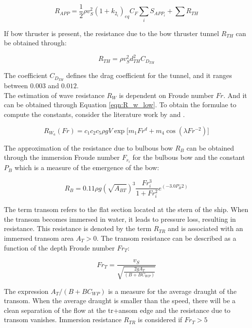 \documentclass[]{interact}
\theoremstyle{plain}%
\theoremstyle{definition}
\theoremstyle{remark}
\begin{document}
\begin{equation}\label{eqn:R_app}
  R_{APP} = \frac{1}{2}\rho v_S^2 (1+k_{2_i})_{eq} C_F \sum_i S_{APP_i} + \sum R_{TH}
\end{equation}

If bow thruster is present, the resistance due to the bow thruster tunnel $R_{TH}$ can be obtained through:

\begin{equation}
  \label{eqn:R_th}
  R_{TH} = \rho v_S^2  d_{TH}^2 C_{D_{TH}}
\end{equation}

The coefficient $C_{D_{TH}}$ defines the drag coefficient for the tunnel, and it ranges between $0.003$ and $0.012$.\\

The estimation of wave resistance $R_W$ is dependent on Froude number $Fr$. And it can be obtained through Equation \ref{eqn:R_w_low}. To obtain the formulae to compute the constants, consider the literature work by \citet{Holtrop.1978,Holtrop.1982,Holtrop.1984} and \citet{Birk.2019}.

\begin{equation}\label{eqn:R_w_low}
  R_{W_a}(Fr) = c_1 c_2 c_5 \rho g V  \exp \biggl[ m_1 Fr^d + m_4 \cos(\lambda Fr ^{-2}) \biggr]
\end{equation}

The approximation of the resistance due to bulbous bow $R_B$ can be obtained through the immersion Froude number $F_{r_i}$ for the bulbous bow and the constant $P_B$ which is a measure of the emergence of the bow: 

\begin{equation}
  \label{eqn:Rbulb}
  R_B = 0.11 \rho g (\sqrt{A_{BT}})^3 \frac{Fr_{i}^3}{1+Fr_{i}^2}e^{(-3.0P_B^-2)}
\end{equation}

The term transom refers to the flat section located at the stern of the ship. When the transom becomes immersed in water, it leads to pressure loss, resulting in resistance. This resistance is denoted by the term $R_{TR}$ and is associated with an immersed transom area $A_T > 0$. The transom resistance can be described as a function of the depth Froude number $Fr_{T}$:

\begin{equation}
  \label{eqn:Fr_t}
  Fr_T = \frac{v_S}{\sqrt{\frac{2gA_T}{(B+BC_{WP})}}}
\end{equation}

The expression $A_T/(B+BC_{WP})$ is a measure for the average draught of the transom. When the average draught is smaller than the speed, there will be a clean separation of the flow at the tr+ansom edge and the resistance due to transom vanishes. Immersion resistance $R_{TR}$ is considered if $Fr_{T} > 5$
\end{document}
